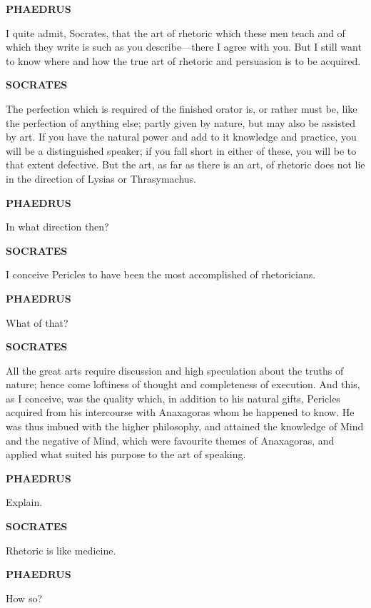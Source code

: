 \documentclass[11pt,letter]{article}
\begin{document}
\par \textbf{PHAEDRUS}
\par   I quite admit, Socrates, that the art of rhetoric which these men teach and of which they write is such as you describe—there I agree with you. But I still want to know where and how the true art of rhetoric and persuasion is to be acquired.

\par \textbf{SOCRATES}
\par   The perfection which is required of the finished orator is, or rather must be, like the perfection of anything else; partly given by nature, but may also be assisted by art. If you have the natural power and add to it knowledge and practice, you will be a distinguished speaker; if you fall short in either of these, you will be to that extent defective. But the art, as far as there is an art, of rhetoric does not lie in the direction of Lysias or Thrasymachus.

\par \textbf{PHAEDRUS}
\par   In what direction then?

\par \textbf{SOCRATES}
\par   I conceive Pericles to have been the most accomplished of rhetoricians.

\par \textbf{PHAEDRUS}
\par   What of that?

\par \textbf{SOCRATES}
\par   All the great arts require discussion and high speculation about the truths of nature; hence come loftiness of thought and completeness of execution. And this, as I conceive, was the quality which, in addition to his natural gifts, Pericles acquired from his intercourse with Anaxagoras whom he happened to know. He was thus imbued with the higher philosophy, and attained the knowledge of Mind and the negative of Mind, which were favourite themes of Anaxagoras, and applied what suited his purpose to the art of speaking.

\par \textbf{PHAEDRUS}
\par   Explain.

\par \textbf{SOCRATES}
\par   Rhetoric is like medicine.

\par \textbf{PHAEDRUS}
\par   How so?
\end{document}
